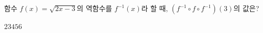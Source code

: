 \hspace*{2mm}\begin{minipage}[t]{\dimexpr\linewidth-2mm\relax}\vspace{0pt}
함수 $f(x)=\sqrt{2x-3}$의 역함수를 $f^{-1}(x)$라 할 때, $(f^{-1}\circ f\circ f^{-1})(3)$의 값은?
\begin{choices32}{$2$}{$3$}{$4$}{$5$}{$6$}\end{choices32}\end{minipage}
